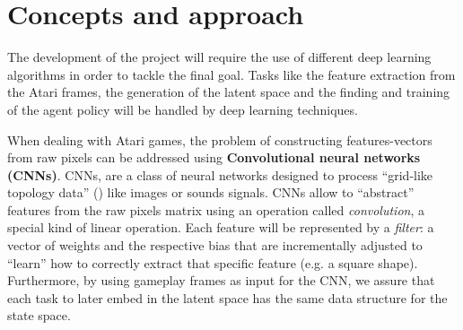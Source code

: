 \section{Concepts and approach}

The development of the project will require the use of different deep learning algorithms in order to tackle the final goal. Tasks like the feature extraction from the Atari frames, the generation of the latent space and the finding and training of the agent policy will be handled by deep learning techniques.

When dealing with Atari games, the problem of constructing features-vectors from raw pixels can be addressed using \textbf{Convolutional neural networks (CNNs)}.
CNNs, are a class of neural networks designed to process ``grid-like topology data'' (\cite{goodfellow2016deep}) like images or sounds signals. CNNs allow to ``abstract'' features from the raw pixels matrix using an operation called \textit{convolution}, a special kind of linear operation. Each feature will be represented by a \textit{filter}: a vector of weights and the respective bias that are incrementally adjusted to ``learn'' how to correctly extract that specific feature (e.g. a square shape). 
Furthermore, by using gameplay frames as input for the CNN, we assure that each task to later embed in the latent space has the same data structure for the state space.  






